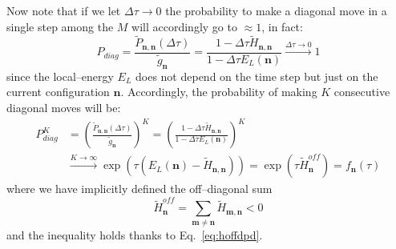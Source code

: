 Now note that if we let $\Delta\tau \to 0$ the probability to make a diagonal move in a single step among the $M$ will accordingly go to $\approx 1$, in fact:
\begin{equation}
P_{diag} = \frac{\widetilde{P}_{\mathbf{n},\mathbf{n}}(\Delta\tau)}{\widetilde{g}_{\mathbf{n}}}
= \frac{1-\Delta\tau \widetilde{H}_{\mathbf{n},\mathbf{n}}}{1-\Delta\tau E_L(\mathbf{n})}
\xrightarrow{\Delta\tau \to 0} 1
\end{equation}
since the local--energy $E_L$ does not depend on the time step but just on the current configuration $\mathbf{n}$. Accordingly, the probability of making $K$ consecutive diagonal moves will be:
\begin{equation}
\begin{split}
P_{diag}^K &=\left( \frac{\widetilde{P}_{\mathbf{n},\mathbf{n}}(\Delta\tau)}{\widetilde{g}_{\mathbf{n}}} \right)^K = \left( \frac{1-\Delta\tau \widetilde{H}_{\mathbf{n},\mathbf{n}}}{1-\Delta\tau E_L(\mathbf{n})} \right)^K\\
&\xrightarrow{K \to \infty} \exp{\left(\tau (E_L(\mathbf{n}) - \widetilde{H}_{\mathbf{n},\mathbf{n}})\right)} = \exp{\left(\tau \widetilde{H}^{off}_{\mathbf{n}}\right)} = f_{\mathbf{n}}(\tau)
\end{split}
\end{equation}
where we have implicitly defined the off--diagonal sum 
\begin{equation}
\label{eq:hoffd}
\widetilde{H}^{off}_{\mathbf{n}} = \sum_{\mathbf{m}\neq \mathbf{n}} \widetilde{H}_{\mathbf{m},\mathbf{n}} <0
\end{equation}
and the inequality holds thanks to Eq.~\eqref{eq:hoffdpd}.

